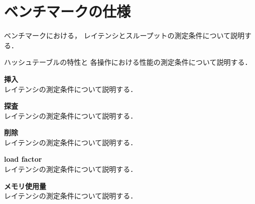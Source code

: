 \section{ベンチマークの仕様}

ベンチマークにおける，
レイテンシとスループットの測定条件について説明する．
\leavevmode \newline

ハッシュテーブルの特性と
各操作における性能の測定条件について説明する．
\leavevmode \newline

{\bf 挿入}
\samepage \\ \indent
レイテンシの測定条件について説明する．
\leavevmode \newline

{\bf 探査}
\samepage \\ \indent
レイテンシの測定条件について説明する．
\leavevmode \newline

{\bf 削除}
\samepage \\ \indent
レイテンシの測定条件について説明する．
\leavevmode \newline

{\bf load factor}
\samepage \\ \indent
レイテンシの測定条件について説明する．
\leavevmode \newline

{\bf メモリ使用量}
\samepage \\ \indent
レイテンシの測定条件について説明する．
\leavevmode \newline





%
%

















